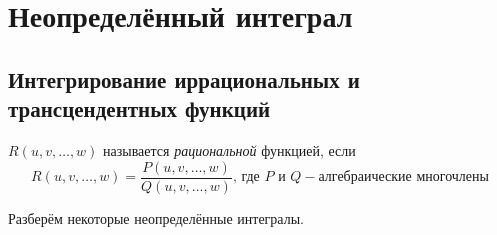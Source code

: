 \section{Неопределённый интеграл}

\subsection{Интегрирование иррациональных и трансцендентных функций}
\begin{definition}
	$R(u, v, \dots, w)$ называется \textit{рациональной} функцией, если
	\[R(u, v, \dots, w) = \frac{P(u, v, \dots, w)}{Q(u, v, \dots, w)}\text{, где
	}P \text{ и } Q - \text{алгебраические многочлены}\]
\end{definition}


Разберём некоторые неопределённые интегралы.
